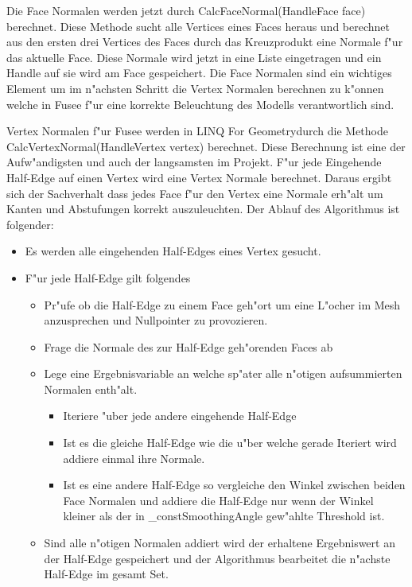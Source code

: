 \documentclass[pagesize, paper=a4, fontsize=12pt,titlepage=true, headings=small, headnosepline, abstractoff, liststotoc, nochapterprefix, plainheadsepline]{scrreprt}
\newcommand{\LFG}{LINQ For Geometry}
\begin{document}
Die Face Normalen werden jetzt durch CalcFaceNormal(HandleFace face) berechnet. Diese Methode sucht alle Vertices eines Faces heraus und berechnet aus den ersten drei Vertices des Faces durch das Kreuzprodukt eine Normale f"ur das aktuelle Face. Diese Normale wird jetzt in eine Liste eingetragen und ein Handle auf sie wird am Face gespeichert. Die Face Normalen sind ein wichtiges Element um im n"achsten Schritt die Vertex Normalen berechnen zu k"onnen welche in Fusee f"ur eine korrekte Beleuchtung des Modells verantwortlich sind.

Vertex Normalen f"ur Fusee werden in \LFG durch die Methode CalcVertexNormal(HandleVertex vertex) berechnet. Diese Berechnung ist eine der Aufw"andigsten und auch der langsamsten im Projekt. F"ur jede Eingehende Half-Edge auf einen Vertex wird eine Vertex Normale berechnet. Daraus ergibt sich der Sachverhalt dass jedes Face f"ur den Vertex eine Normale erh"alt um Kanten und Abstufungen korrekt auszuleuchten. Der Ablauf des Algorithmus ist folgender:

\begin{itemize}
\item Es werden alle eingehenden Half-Edges eines Vertex gesucht.
\item F"ur jede Half-Edge gilt folgendes
	\begin{itemize}
	\item Pr"ufe ob die Half-Edge zu einem Face geh"ort um eine L"ocher im Mesh anzusprechen und Nullpointer zu provozieren.
	\item Frage die Normale des zur Half-Edge geh"orenden Faces ab
	\item Lege eine Ergebnisvariable an welche sp"ater alle n"otigen aufsummierten Normalen enth"alt.
		\begin{itemize}
		\item Iteriere "uber jede andere eingehende Half-Edge
		\item Ist es die gleiche Half-Edge wie die u"ber welche gerade Iteriert wird addiere einmal ihre Normale.
		\item Ist es eine andere Half-Edge so vergleiche den Winkel zwischen beiden Face Normalen und addiere die Half-Edge nur wenn der Winkel kleiner als der in \_constSmoothingAngle gew"ahlte Threshold ist.
		\end{itemize}
	\item Sind alle n"otigen Normalen addiert wird der erhaltene Ergebniswert an der Half-Edge gespeichert und der Algorithmus bearbeitet die n"achste Half-Edge im gesamt Set.
	\end{itemize}
\end{itemize}
\end{document}
